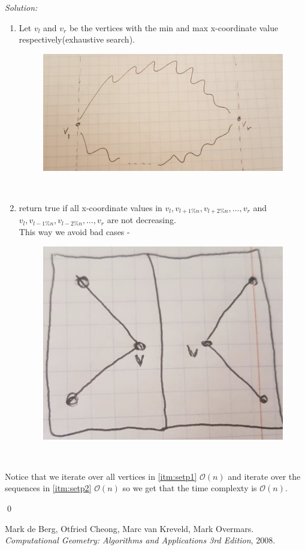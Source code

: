 \documentclass[a4paper, 8pt, oneside]{article}
\newenvironment{sol}
    {\emph{Solution:}
    }
    {
    \qed
    }
\begin{document}
\begin{enumerate}
\begin{sol}
 \begin{enumerate}
   \item  \label{itm:setp1}  Let $v_l$ and $v_r$ be the  vertices with the min and max  x-coordinate value  respectively(exhaustive search).
    \begin{figure}[h!]
\includegraphics[scale=0.4]{chanis}
\centering
\end{figure} \\
\item \label{itm:setp2} return true if all  x-coordinate values in  $v_l, v_{l+1\%n}, v_{l+2\%n}, \ldots, v_r$ and $v_l, v_{l-1\%n}, v_{l-2\%n}, \ldots, v_r$ are not decreasing.\\
This way we avoid bad cases -
    \begin{figure}[h!]
\includegraphics[scale=0.4]{ver}
\centering
\end{figure} \\
\end{enumerate}
Notice that we iterate over all vertices in \ref{itm:setp1} $\mathcal{O}(n)$ and iterate over the sequences in \ref{itm:setp2} $\mathcal{O}(n)$  so we get that the time complexty is $\mathcal{O}(n)$.
\end{sol}

\end{enumerate}


\medskip
 
\begin{thebibliography}{9}
Mark de Berg, Otfried Cheong, Marc van Kreveld, Mark Overmars.
\textit{Computational Geometry: Algorithms and Applications 3rd Edition}, 2008.
\end{thebibliography}
\end{document}
